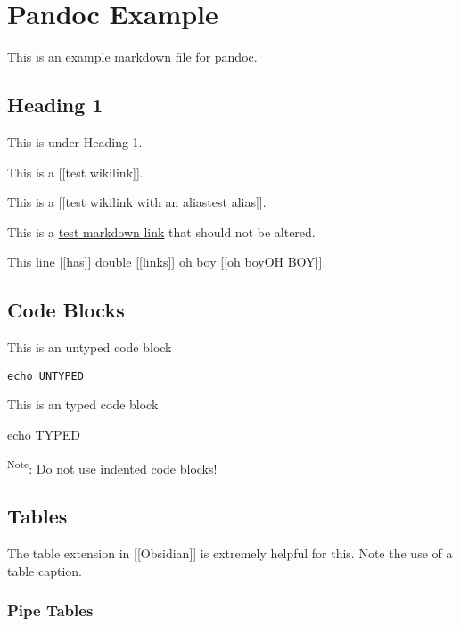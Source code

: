 \documentclass[
]{article}
\author{}
\date{}
\newenvironment{Shaded}{}{}
\newcommand{\BuiltInTok}[1]{#1}
\newcommand{\NormalTok}[1]{#1}
\begin{document}
\hypertarget{pandoc-example}{%
\section{Pandoc Example}\label{pandoc-example}}

This is an example markdown file for pandoc.

\hypertarget{heading-1}{%
\subsection{Heading 1}\label{heading-1}}

This is under Heading 1.

This is a {[}{[}test wikilink{]}{]}.

This is a {[}{[}test wikilink with an alias\textbar test alias{]}{]}.

This is a \href{path}{test markdown link} that should not be altered.

This line {[}{[}has{]}{]} double {[}{[}links{]}{]} oh boy {[}{[}oh
boy\textbar OH BOY{]}{]}.

\hypertarget{code-blocks}{%
\subsection{Code Blocks}\label{code-blocks}}

This is an untyped code block

\begin{verbatim}
echo UNTYPED
\end{verbatim}

This is an typed code block

\begin{Shaded}
\begin{Highlighting}[]
\BuiltInTok{echo}\NormalTok{ TYPED}
\end{Highlighting}
\end{Shaded}

\textsuperscript{Note}: Do not use indented code blocks!

\hypertarget{sec:tables-section}{%
\subsection{Tables}\label{sec:tables-section}}

The table extension in {[}{[}Obsidian{]}{]} is extremely helpful for
this. Note the use of a table caption.

\hypertarget{pipe-tables}{%
\subsubsection{Pipe Tables}\label{pipe-tables}}
\end{document}
